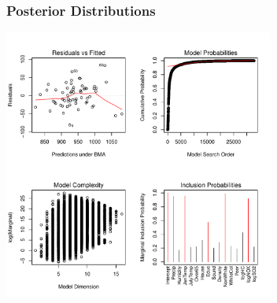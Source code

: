 \documentclass[handout]{beamer}
\begin{document}
\begin{frame}\frametitle{Posterior Distributions}
  \includegraphics[height=3.5in]{mort-sum}
\end{frame}
\end{document}
